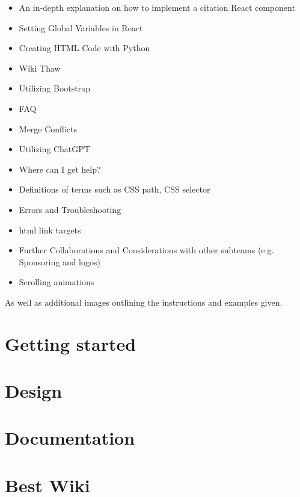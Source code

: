 \documentclass[a4paper, 11pt, twoside]{book}
\begin{document}
\begin{itemize}
    \item An in-depth explanation on how to implement a citation React component
    \item Setting Global Variables in React
    \item Creating HTML Code with Python
    \item Wiki Thaw
    \item Utilizing Bootstrap
    \item FAQ
    \item Merge Conflicts
    \item Utilizing ChatGPT
    \item Where can I get help?
    \item Definitions of terms such as CSS path, CSS selector
    \item Errors and Troubleshooting
    \item html link targets
    \item Further Collaborations and Considerations with other subteams (e.g. Sponsoring and logos)
    \item Scrolling animations
\end{itemize}
As well as additional images outlining the instructions and examples given.
\newpage

\mainmatter
\pagecolor{pagecolor}
\chapter{Getting started} \label{sec:started}
%
\newpage
\chapter{Design} \label{sec:design}
%
\newpage
\chapter{Documentation} \label{sec:docu}
%
\newpage
%
\chapter{Best Wiki} \label{sec:bestwiki}
%
\newpage
\end{document}
